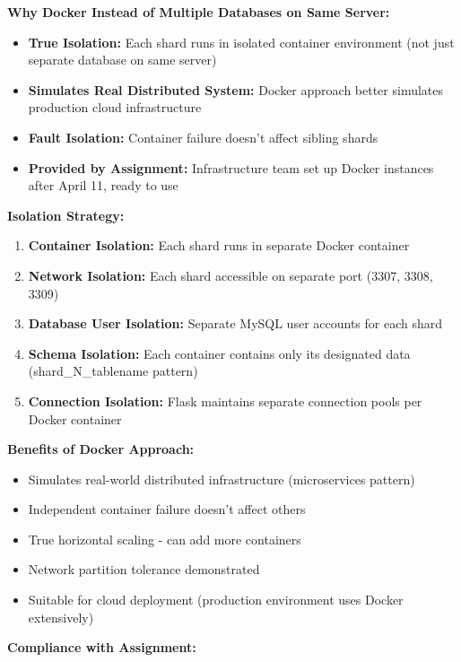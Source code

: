 \documentclass[12pt,a4paper]{article}
\begin{document}
\textbf{Why Docker Instead of Multiple Databases on Same Server:}

\begin{itemize}
    \item \textbf{True Isolation:} Each shard runs in isolated container environment (not just separate database on same server)
    \item \textbf{Simulates Real Distributed System:} Docker approach better simulates production cloud infrastructure
    \item \textbf{Fault Isolation:} Container failure doesn't affect sibling shards
    \item \textbf{Provided by Assignment:} Infrastructure team set up Docker instances after April 11, ready to use
\end{itemize}

\textbf{Isolation Strategy:}

\begin{enumerate}
    \item \textbf{Container Isolation:} Each shard runs in separate Docker container
    \item \textbf{Network Isolation:} Each shard accessible on separate port (3307, 3308, 3309)
    \item \textbf{Database User Isolation:} Separate MySQL user accounts for each shard
    \item \textbf{Schema Isolation:} Each container contains only its designated data (shard_N_tablename pattern)
    \item \textbf{Connection Isolation:} Flask maintains separate connection pools per Docker container
\end{enumerate}

\textbf{Benefits of Docker Approach:}

\begin{itemize}
    \item Simulates real-world distributed infrastructure (microservices pattern)
    \item Independent container failure doesn't affect others
    \item True horizontal scaling - can add more containers
    \item Network partition tolerance demonstrated
    \item Suitable for cloud deployment (production environment uses Docker extensively)
\end{itemize}

\textbf{Compliance with Assignment:}
\end{document}
